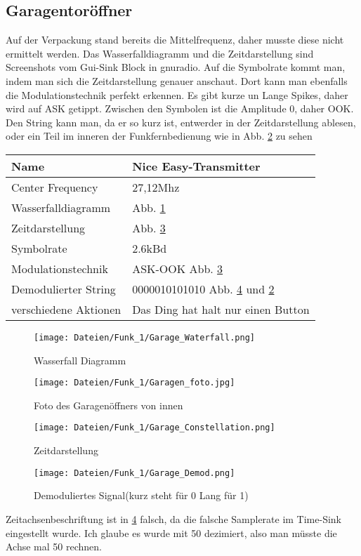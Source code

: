 \documentclass[12pt,a4paper]{article}
\begin{document}
\subsection{Garagentoröffner}
Auf der Verpackung stand bereits die Mittelfrequenz, daher musste diese nicht ermittelt werden. Das Wasserfalldiagramm und die Zeitdarstellung sind Screenshots vom Gui-Sink Block in gnuradio. Auf die Symbolrate kommt man, indem man sich die Zeitdarstellung genauer anschaut. Dort kann man ebenfalls die Modulationstechnik perfekt erkennen. Es gibt kurze un Lange Spikes, daher wird auf ASK getippt. Zwischen den Symbolen ist die Amplitude 0, daher OOK. Den String kann man, da er so kurz ist, entwerder in der Zeitdarstellung ablesen, oder ein Teil im inneren der Funkfernbedienung wie in Abb. \ref{fig:6} zu sehen
\begin{table}[H]
\centering
\begin{tabular}{|l|l|}
\hline
Name & Nice Easy-Transmitter \\
\hline
Center Frequency& 27,12Mhz \\
\hline
Wasserfalldiagramm & Abb. \ref{fig:3} \\
\hline
Zeitdarstellung & Abb. \ref{fig:4} \\
\hline
Symbolrate & 2.6kBd\\
\hline
Modulationstechnik & ASK-OOK Abb. \ref{fig:4} \\
\hline
Demodulierter String & 0000010101010 Abb. \ref{fig:5} und \ref{fig:6}\\
\hline
verschiedene Aktionen & Das Ding hat halt nur einen Button \\
\hline
\end{tabular}
\end{table}
\begin{figure}[H]
\centering
\texttt{[image: Dateien/Funk\_1/Garage\_Waterfall.png]} 
\caption{Wasserfall Diagramm}
\label{fig:3}
\end{figure}
\begin{figure}[H]
\centering
\texttt{[image: Dateien/Funk\_1/Garagen\_foto.jpg]} 
\caption{Foto des Garagenöffners von innen}
\label{fig:6}
\end{figure}
\begin{figure}[H]
\centering
\texttt{[image: Dateien/Funk\_1/Garage\_Constellation.png]} 
\caption{Zeitdarstellung}
\label{fig:4}
\end{figure}
\begin{figure}[H]
\centering
\texttt{[image: Dateien/Funk\_1/Garage\_Demod.png]}
\caption{Demoduliertes Signal(kurz steht für 0 Lang für 1)} 
\label{fig:5}
\end{figure}
Zeitachsenbeschriftung ist in \ref{fig:5} falsch, da die falsche Samplerate im Time-Sink eingestellt wurde. Ich glaube es wurde mit 50 dezimiert, also man müsste die Achse mal 50 rechnen.
\end{document}
